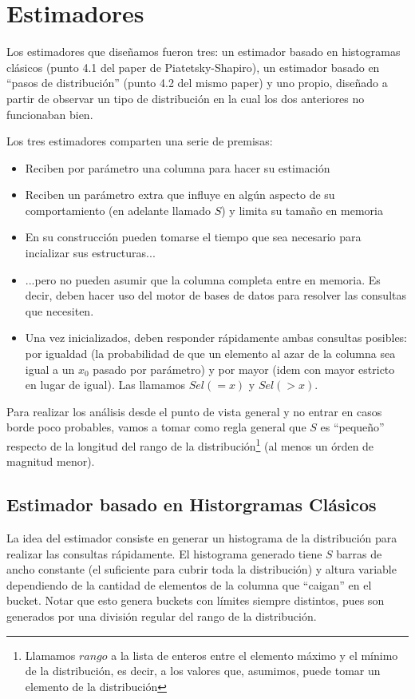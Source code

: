\section{Estimadores}
Los estimadores que diseñamos fueron tres: un estimador basado en histogramas clásicos (punto 4.1 del paper de Piatetsky-Shapiro), un estimador basado en ``pasos de distribución'' (punto 4.2 del mismo paper) y uno propio, diseñado a partir de observar un tipo de distribución en la cual los dos anteriores no funcionaban bien.

Los tres estimadores comparten una serie de premisas:
\begin{itemize}
 \item Reciben por parámetro una columna para hacer su estimación
 \item Reciben un parámetro extra que influye en algún aspecto de su comportamiento (en adelante llamado $S$) y limita su tamaño en memoria
 \item En su construcción pueden tomarse el tiempo que sea necesario para incializar sus estructuras...
 \item ...pero no pueden asumir que la columna completa entre en memoria. Es decir, deben hacer uso del motor de bases de datos para resolver las consultas que necesiten. 
 \item Una vez inicializados, deben responder rápidamente ambas consultas posibles: por igualdad (la probabilidad de que un elemento al azar de la columna sea igual a un $x_0$ pasado por parámetro) y por mayor (idem con mayor estricto en lugar de igual). Las llamamos $Sel(=x)$ y $Sel(>x)$.
\end{itemize}

Para realizar los análisis desde el punto de vista general y no entrar en casos borde poco probables, vamos a tomar como regla general que $S$ es ``pequeño'' respecto de la longitud del rango de la distribución\footnote{Llamamos $rango$ a la lista de enteros entre el elemento máximo y el mínimo de la distribución, es decir, a los valores que, asumimos, puede tomar un elemento de la distribución} (al menos un órden de magnitud menor).


\subsection{Estimador basado en Historgramas Clásicos}
La idea del estimador consiste en generar un histograma de la distribución para realizar las consultas rápidamente. El histograma generado tiene $S$ barras de ancho constante (el suficiente para cubrir toda la distribución) y altura variable dependiendo de la cantidad de elementos de la columna que ``caigan'' en el bucket. Notar que esto genera buckets con límites siempre distintos, pues son generados por una división regular del rango de la distribución.

